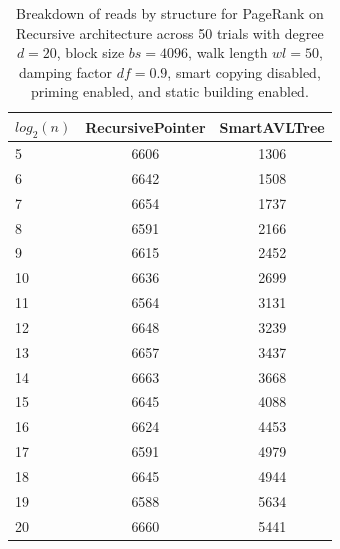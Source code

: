 \begin{table}[]
\centering
\begin{tabular}{|l|c|c|}
$log_2(n)$ & RecursivePointer & SmartAVLTree \\ \hline
5 & 6606 & 1306 \\ \hline
6 & 6642 & 1508 \\ \hline
7 & 6654 & 1737 \\ \hline
8 & 6591 & 2166 \\ \hline
9 & 6615 & 2452 \\ \hline
10 & 6636 & 2699 \\ \hline
11 & 6564 & 3131 \\ \hline
12 & 6648 & 3239 \\ \hline
13 & 6657 & 3437 \\ \hline
14 & 6663 & 3668 \\ \hline
15 & 6645 & 4088 \\ \hline
16 & 6624 & 4453 \\ \hline
17 & 6591 & 4979 \\ \hline
18 & 6645 & 4944 \\ \hline
19 & 6588 & 5634 \\ \hline
20 & 6660 & 5441 \\ \hline
\end{tabular}
\caption{Breakdown of reads by structure for PageRank on Recursive architecture across 50 trials with degree $d=20$, block size $bs=4096$, walk length $wl=50$, damping factor $df=0.9$, smart copying disabled, priming enabled, and static building enabled.}
    \label{tab:reads_by_structure_pr_d20_bs4096_trials50_copiesfalse_primetrue_staticinsertiontrue_wl50_df0.9_ptrecursive_movetrue}
\end{table}

